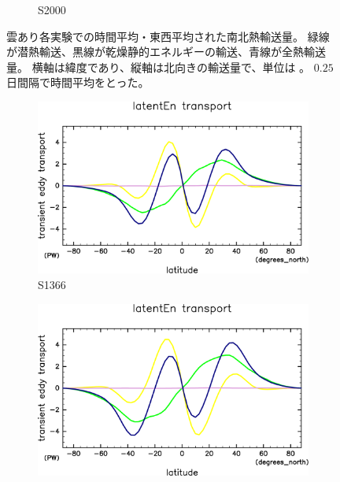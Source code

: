 \documentclass[body]{subfiles}
\begin{document}
\begin{figure}[t]
\begin{subfigure}{.4\textwidth}
		\caption{S2000}\label{EnFlxS2000}
	\end{subfigure}
	\caption[雲あり各実験での南北熱輸送量]{
		雲あり各実験での時間平均・東西平均された南北熱輸送量。
		緑線が潜熱輸送、黒線が乾燥静的エネルギーの輸送、青線が全熱輸送量。
		横軸は緯度であり、縦軸は北向きの輸送量で、単位は 。
		\(0.25\) 日間隔で時間平均をとった。
	}\label{EnFlx}
\end{figure}

\begin{figure}[t]
	\centering
	\begin{subfigure}{.4\textwidth}
		\centering
		\includegraphics[width=\textwidth]{S1366/MeriHeatTrans@latentEn,time=14600:14965-crop-rotate.pdf}
		\caption{S1366}\label{潜熱S1366}
	\end{subfigure}
	\begin{subfigure}{.4\textwidth}
		\centering
		\includegraphics[width=\textwidth]{S1500/MeriHeatTrans@latentEn,time=3650:4015-crop-rotate.pdf}

\end{subfigure}
\end{figure}
\end{document}
